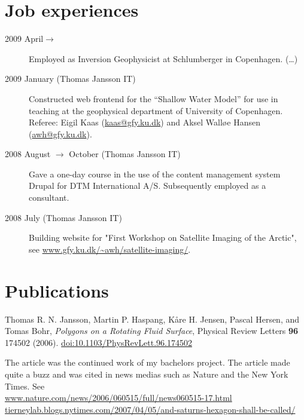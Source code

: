 \documentclass[margin, line, a4paper]{resume}
\begin{document}
\begin{resume}
    

\section{\mysidestyle Job experiences}\vspace{1mm}
\begin{description}
    
    \item[2009 April$\rightarrow$ ] Employed as Inversion Geophysicist at
    Schlumberger in Copenhagen. (\ldots)

    \item[2009 January (Thomas Jansson IT)] Constructed web frontend for 
    the ``Shallow Water Model'' for use in teaching at the geophysical
    department of University of Copenhagen. Referee: Eigil Kaas
    (\href{mailto:kaas@gfy.ku.dk}{kaas@gfy.ku.dk}) and Aksel Walløe Hansen
    (\href{mailto:awh@gfy.ku.dk}{awh@gfy.ku.dk}).
    \item[2008 August $\rightarrow$ October (Thomas Jansson IT)] Gave a one-day course 
    in the use of the content management system Drupal for DTM International
    A/S. Subsequently employed as a consultant. 
    \item[2008 July (Thomas Jansson IT)] Building website for "First Workshop on Satellite Imaging
    of the Arctic", see \url{www.gfy.ku.dk/~awh/satellite-imaging/}. 
\end{description}


\section{\mysidestyle Publications}

    Thomas R. N. Jansson, Martin P. Haspang, Kåre H. Jensen, Pascal
    Hersen, and Tomas Bohr, \textit{Polygons on a Rotating Fluid
    Surface}, Physical Review Letters \textbf{96} 174502 (2006).
    \url{doi:10.1103/PhysRevLett.96.174502} 
    
    The article was the continued work of my bachelors project. The
    article made quite a buzz and was cited in news medias such as Nature
    and the New York Times. See\\
    \href{http://www.nature.com/news/2006/060515/full/news060515-17.html}{www.nature.com/news/2006/060515/full/news060515-17.html}\\
    \href{http://tierneylab.blogs.nytimes.com/2007/04/05/and-saturns-hexagon-shall-be-called/}{tierneylab.blogs.nytimes.com/2007/04/05/and-saturns-hexagon-shall-be-called/}




\end{resume}
\end{document}
